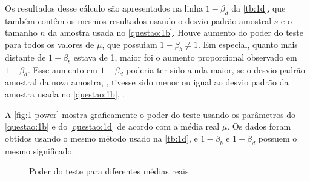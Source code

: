 
Os resultados desse cálculo são apresentados na linha $1 - \beta_d$ da
\autoref{tb:1d}, que também contêm os mesmos resultados usando o
desvio padrão amostral $s$ e o tamanho $n$ da amostra usada no
\autoref{questao:1b}. Houve aumento do poder do teste para todos os
valores de $\mu$, que possuiam $1 - \beta_b \neq 1$. Em especial,
quanto mais distante de $1 - \beta_b$ estava de 1, maior foi o aumento
proporcional observado em $1 - \beta_d$. Esse aumento em $1 - \beta_d$
poderia ter sido ainda maior, se o desvio padrão amostral da nova
amostra, \UMDs, tivesse sido menor ou igual ao desvio padrão da
amostra usada no \autoref{questao:1b}, \UMAs.



A \autoref{fig:1-power} mostra graficamente o poder do teste usando os
parâmetros do \autoref{questao:1b} e do \autoref{questao:1d} de acordo
com a média real $\mu$. Os dados foram obtidos usando o mesmo método
usado na \autoref{tb:1d}, e $1 - \beta_b$ e $1 - \beta_d$ possuem o
mesmo significado.

\begin{figure}[ht]
  \centering
  
  \caption{Poder do teste para diferentes médias reais}
  \label{fig:1-power}
\end{figure}

